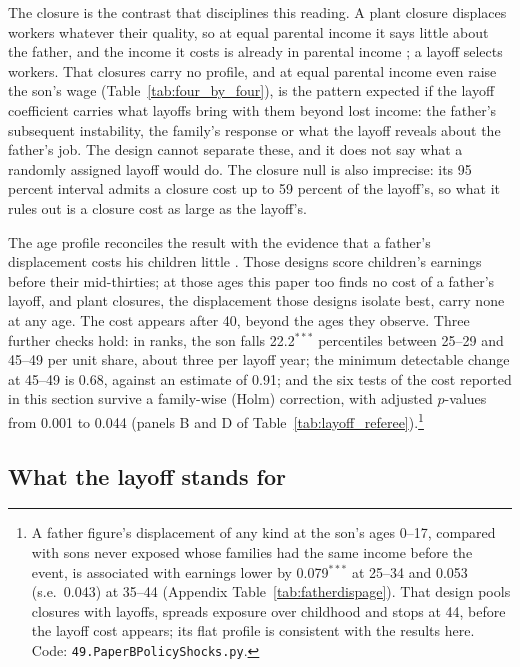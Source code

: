 The closure is the contrast that disciplines this reading. A plant closure displaces workers whatever their quality,
so at equal parental income it says little about the father, and the income it costs is already in parental income
\citep{gibbons1991layoffs}; a layoff selects workers. That closures carry no profile, and at equal parental income even
raise the son's wage (Table~\ref{tab:four_by_four}), is the pattern expected if the layoff coefficient carries what
layoffs bring with them beyond lost income: the father's subsequent instability, the family's response or what the
layoff reveals about the father's job. The design cannot separate these, and it does not say what a randomly assigned
layoff would do. The closure null is also imprecise: its 95 percent interval admits a closure cost up to 59 percent of
the layoff's, so what it rules out is a closure cost as large as the layoff's.

The age profile reconciles the result with the evidence that a father's displacement costs his children little
\citep{oreopoulos2008intergenerational, hilger2016parental}. Those designs score children's earnings before their
mid-thirties; at those ages this paper too finds no cost of a father's layoff, and plant closures, the displacement
those designs isolate best, carry none at any age. The cost appears after 40, beyond the ages they observe. Three further
checks hold: in ranks, the son falls 22.2$^{***}$ percentiles between 25--29 and 45--49 per unit share, about three per
layoff year; the minimum detectable change at 45--49 is 0.68, against an estimate of 0.91; and the six tests of the cost
reported in this section survive a family-wise (Holm) correction, with adjusted $p$-values from 0.001 to 0.044 (panels B and
D of Table~\ref{tab:layoff_referee}).\footnote{A father figure's displacement of any kind at the son's ages 0--17, compared with sons never
exposed whose families had the same income before the event, is associated with earnings lower by 0.079$^{***}$ at
25--34 and 0.053 (s.e.\ 0.043) at 35--44 (Appendix Table~\ref{tab:fatherdispage}). That design pools closures with layoffs,
spreads exposure over childhood and stops at 44, before the layoff cost appears; its flat profile is consistent with the
results here. Code: \texttt{49.PaperBPolicyShocks.py}.}

\subsection{What the layoff stands for}

